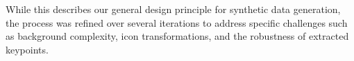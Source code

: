 While this describes our general design principle for synthetic data generation, the process was refined over several iterations to address specific challenges such as background complexity, icon transformations, and the robustness of extracted keypoints.

